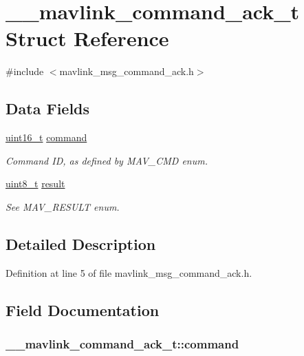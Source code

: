 \hypertarget{struct____mavlink__command__ack__t}{\section{\-\_\-\-\_\-mavlink\-\_\-command\-\_\-ack\-\_\-t Struct Reference}
\label{struct____mavlink__command__ack__t}
}


{\ttfamily \#include $<$mavlink\-\_\-msg\-\_\-command\-\_\-ack.\-h$>$}

\subsection*{Data Fields}
\begin{DoxyCompactItemize}
\item 
\hyperlink{stdint_8h_a273cf69d639a59973b6019625df33e30}{uint16\-\_\-t} \hyperlink{struct____mavlink__command__ack__t_a4c63e16e7da216bf952f61e33a4ad5e7}{command}
\begin{DoxyCompactList}\small\item\em Command I\-D, as defined by M\-A\-V\-\_\-\-C\-M\-D enum. \end{DoxyCompactList}\item 
\hyperlink{stdint_8h_aba7bc1797add20fe3efdf37ced1182c5}{uint8\-\_\-t} \hyperlink{struct____mavlink__command__ack__t_ae8165e8e4f7a1438977e1a7edd646b69}{result}
\begin{DoxyCompactList}\small\item\em See M\-A\-V\-\_\-\-R\-E\-S\-U\-L\-T enum. \end{DoxyCompactList}\end{DoxyCompactItemize}


\subsection{Detailed Description}


Definition at line 5 of file mavlink\-\_\-msg\-\_\-command\-\_\-ack.\-h.



\subsection{Field Documentation}
\hypertarget{struct____mavlink__command__ack__t_a4c63e16e7da216bf952f61e33a4ad5e7}{
\subsubsection[{command}]{ \-\_\-\-\_\-mavlink\-\_\-command\-\_\-ack\-\_\-t\-::command}}\label{struct____mavlink__command__ack__t_a4c63e16e7da216bf952f61e33a4ad5e7}


